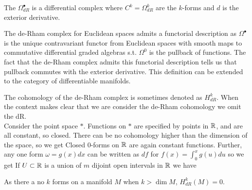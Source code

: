 \documentclass{article}
\begin{document}
\begin{definition}
	The  $\Omega^\bullet_{dR}$ is a differential complex where $C^k = \Omega^k_{dR}$ are the $k$-forms and $d$ is the exterior derivative. 
\end{definition}



\begin{remark}
	The de-Rham complex for Euclidean spaces admits a functorial description as $\Omega^\bullet$ is the unique contravariant functor from Euclidean spaces with smooth maps to commutative differential graded algebras s.t. $\Omega^0$ is the pullback of functions. The fact that the de-Rham complex admits this functorial description tells us that pullback commutes with the exterior derivative. This definition can be extended to the category of differentiable manifolds. 
\end{remark}



\begin{example}
	The cohomology of the de-Rham complex is sometimes denoted as $H^k_{dR}$. When the context makes clear that we are consider the de-Rham cohomology we omit the dR. \\
	Consider the point space $\ast$. Functions on $\ast$ are specified by points in $\mathbb{R}$, and are all constant, so closed. There can be no cohomology higher than the dimension of the space, so we get 
	Closed $0$-forms on $\mathbb{R}$ are again constant functions. Further, any one form $\omega = g(x)dx$ can be written as $df$ for $f(x) = \int_0^x g(u) du$ so we get 
	If $U\subset \mathbb{R}$ is a union of $m$ dijoint open intervals in $\mathbb{R}$ we have 
\end{example}

\begin{remark}
	As there a no $k$ forms on a manifold $M$ when $k > \dim M$, $H^k_{dR}(M)=0$.
\end{remark}
\end{document}

